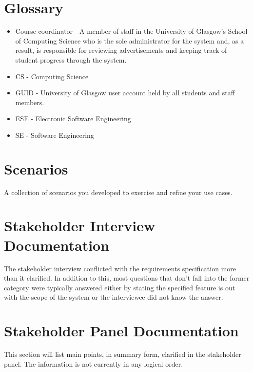 \documentclass{l3deliverable}
\begin{document}
\appendix

\section{Glossary}

\begin{itemize}

\item Course coordinator - A member of staff in the University of Glasgow's
School of Computing Science who is the sole administrator for the system and, as
a result, is responsible for reviewing advertisements and keeping track of 
student progress through the system.

\item CS - Computing Science

\item GUID - University of Glasgow user account held by all students and staff
members.

\item ESE - Electronic Software Engineering

\item SE - Software Engineering

\end{itemize}

\section{Scenarios}

A collection of scenarios you developed to exercise and refine your
use cases.

\section{Stakeholder Interview Documentation}

The stakeholder interview conflicted with the requirements specification more
than it clarified. In addition to this, most questions that don't fall into the
former category were typically answered either by stating the specified
feature is out with the scope of the system or the interviewee did not
know the answer.

\section{Stakeholder Panel Documentation}

This section will list main points, in summary form, clarified in the
stakeholder panel. The information is not currently in any logical order.
\end{document}

